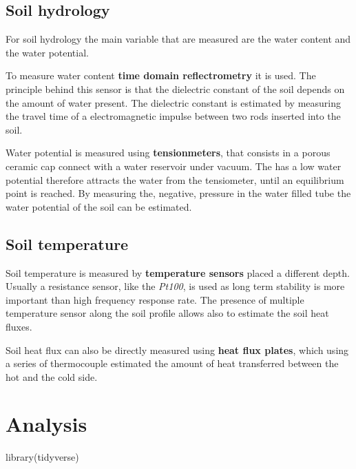 \documentclass[
]{article}
\newenvironment{Shaded}{\begin{snugshade}}{\end{snugshade}}
\newcommand{\FunctionTok}[1]{\textcolor[rgb]{0.00,0.00,0.00}{#1}}
\newcommand{\NormalTok}[1]{#1}
\begin{document}
\hypertarget{soil-hydrology}{%
\subsection{Soil hydrology}\label{soil-hydrology}}

For soil hydrology the main variable that are measured are the water content and the water potential.

To measure water content \textbf{time domain reflectrometry} it is used.
The principle behind this sensor is that the dielectric constant of the soil depends on the amount of water present.
The dielectric constant is estimated by measuring the travel time of a electromagnetic impulse between two rods inserted into the soil.

Water potential is measured using \textbf{tensionmeters}, that consists in a porous ceramic cap connect with a water reservoir under vacuum.
The has a low water potential therefore attracts the water from the tensiometer, until an equilibrium point is reached. By measuring the, negative, pressure in the water filled tube the water potential of the soil can be estimated.

\hypertarget{soil-temperature}{%
\subsection{Soil temperature}\label{soil-temperature}}

Soil temperature is measured by \textbf{temperature sensors} placed a different depth.
Usually a resistance sensor, like the \emph{Pt100}, is used as long term stability is more important than high frequency response rate.
The presence of multiple temperature sensor along the soil profile allows also to estimate the soil heat fluxes.

Soil heat flux can also be directly measured using \textbf{heat flux plates}, which using a series of thermocouple estimated the amount of heat transferred between the hot and the cold side.

\newpage

\hypertarget{analysis}{%
\section{Analysis}\label{analysis}}

\begin{Shaded}
\begin{Highlighting}[]
\FunctionTok{library}\NormalTok{(tidyverse)}
\end{Highlighting}
\end{Shaded}
\end{document}
